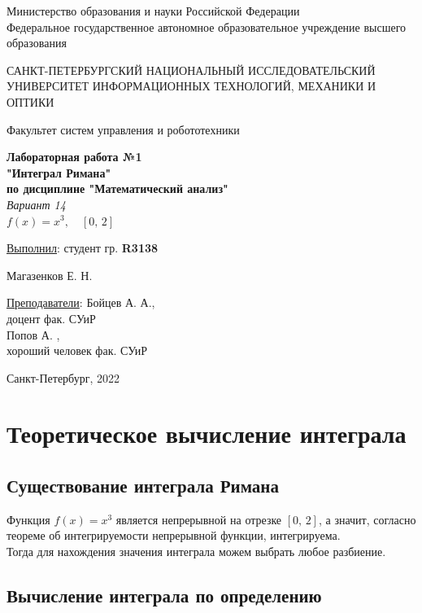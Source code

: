\documentclass[a4paper, 11pt]{article}
\newcommand*{\titlePage}{
	\thispagestyle{empty}
	\begingroup
	\begin{center}
		{\footnotesize
			Министерство образования и науки Российской Федерации\\
			Федеральное государственное автономное образовательное учреждение высшего образования
		}
		
		\vspace*{6ex}
		
		{\large
			САНКТ-ПЕТЕРБУРГСКИЙ НАЦИОНАЛЬНЫЙ ИССЛЕДОВАТЕЛЬСКИЙ УНИВЕРСИТЕТ ИНФОРМАЦИОННЫХ ТЕХНОЛОГИЙ, МЕХАНИКИ И ОПТИКИ	
		}
		
		\vspace*{2ex}
		
		{\large
			Факультет систем управления и робототехники
		}
		
		\vspace*{15ex}
		
		{\LARGE \bfseries 
			Лабораторная работа №1\\
			"Интеграл Римана"\\
			по дисциплине "Математический анализ"\\
		}
		\vspace*{2ex}
		{\Large \itshape
			Вариант 14 \\
			$f(x) = x^3, \quad [0,\,2]$
		}
	\end{center}
	\vspace*{20ex}
	\begin{flushright}
		{\Large 
			\underline{Выполнил}: студент гр. \textbf{R3138}\\
			\begin{flushright}
				Магазенков Е. Н.\\
			\end{flushright}
		}
		
		\vspace*{5ex}
		
		{\Large 
			\underline{Преподаватели}: Бойцев А. А.,\\
			доцент фак. СУиР \\
			Попов А. ,\\
			хороший человек фак. СУиР
		}
	\end{flushright}	
	
	\vspace*{30ex}
	\begin{center}
		{\large 
			Санкт-Петербург, 2022
		}
	\end{center}
	\endgroup}
\begin{document}
	
	\titlePage
	\newpage
	\section{Теоретическое вычисление интеграла}
	\subsection{Существование интеграла Римана}
	Функция $f(x) = x^3$ является непрерывной на отрезке $[0,\,2]$, а значит, согласно теореме об интегрируемости непрерывной функции, интегрируема. \\
	Тогда для нахождения значения интеграла можем выбрать любое разбиение. 
	
	\subsection{Вычисление интеграла по определению}
\end{document}
